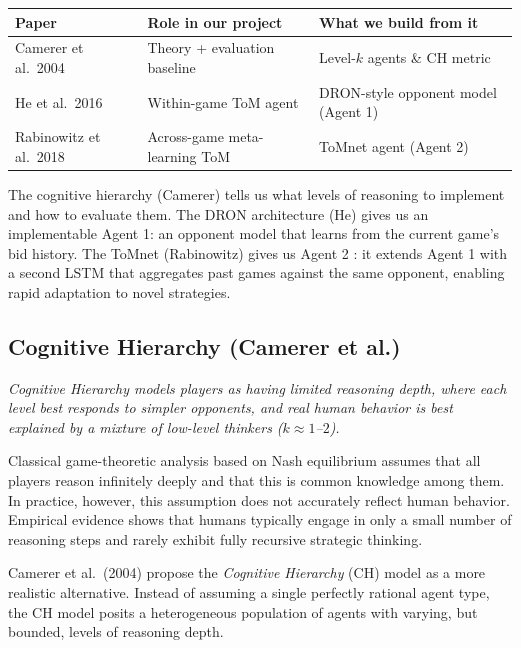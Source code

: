 \documentclass{article}
\begin{document}
\begin{center}
\begin{tabular}{lll}
\toprule
\textbf{Paper} & \textbf{Role in our project} & \textbf{What we build from it} \\
\midrule
Camerer et al.\ 2004 & Theory + evaluation baseline & Level-$k$ agents \& CH metric \\
He et al.\ 2016 & Within-game ToM agent & DRON-style opponent model (Agent 1) \\
Rabinowitz et al.\ 2018 & Across-game meta-learning ToM & ToMnet agent (Agent 2) \\
\bottomrule
\end{tabular}
\end{center}

The cognitive hierarchy (Camerer) tells us what levels of reasoning to implement and how to evaluate them. The DRON architecture (He) gives us an implementable Agent 1: an opponent model that learns from the current game’s bid history. The ToMnet (Rabinowitz) gives us Agent 2 : it extends Agent 1 with a second LSTM that aggregates past games against the same opponent, enabling rapid adaptation to novel strategies.


\subsection{Cognitive Hierarchy (Camerer et al.)}

\begin{center}
\textit{
Cognitive Hierarchy models players as having limited reasoning depth, where each level best responds to simpler opponents, and real human behavior is best explained by a mixture of low-level thinkers ($k \approx 1$--$2$).
}
\end{center}

Classical game-theoretic analysis based on Nash equilibrium assumes that all players reason infinitely deeply and that this is common knowledge among them. In practice, however, this assumption does not accurately reflect human behavior. Empirical evidence shows that humans typically engage in only a small number of reasoning steps and rarely exhibit fully recursive strategic thinking.

Camerer et al.\ (2004) propose the \textit{Cognitive Hierarchy} (CH) model as a more realistic alternative. Instead of assuming a single perfectly rational agent type, the CH model posits a heterogeneous population of agents with varying, but bounded, levels of reasoning depth.
\end{document}
